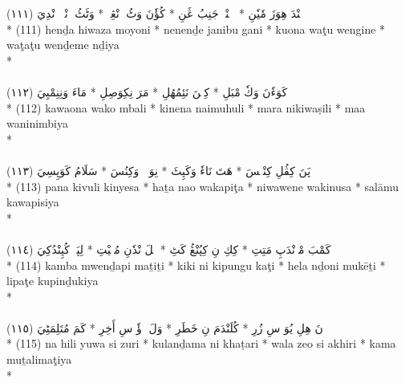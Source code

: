 \documentclass[a4paper, 12pt]{report}
\begin{document}
\begin{center}
\textarabic{(١١١) \textcolor{mygreen}{هٖنْدَ هِوَزَ مٗيٗنِ  * نٖنٖنْدٖ جَنِبُ ڠَنِ  * كُؤٗنَ وَٹُ وٖنْڠِنٖ  * وَٹَٹُ وٖنْدٖمٖ نْدِيَ }} \\* 
(111) henḏa hiwaza moyoni  * nenenḏe janibu gani  * kuona waţu wengine  * waţaţu wenḏeme nḏiya  \\* 
 \\ 
\\[8mm] 

\textarabic{(١١٢) \textcolor{mygreen}{كَوَءٗنَ وَكٗ مْبَلِ  * كِنٖنَ نَئِمُهُلِ  * مَرَ نِكِوَصِلِ  * مَاءَ وَنِنِمْبِيَ }} \\* 
(112) kawaona wako mbali  * kinena naimuhuli  * mara nikiwaṣili  * maa waninimbiya  \\* 
 \\ 
\\[8mm] 

\textarabic{(١١٣) \textcolor{mygreen}{پَنَ كِڤُلِ كِنْيٖسَ  * هَتَ نَاءٗ وَكَپِٹَ  * نِوَوٖنٖ وَكِنُسَ  * سَلَامُ كَوَپِسِيَ }} \\* 
(113) pana kivuli kinyesa  * haṯa nao wakapiţa  * niwawene wakinusa  * salāmu kawapisiya  \\* 
 \\ 
\\[8mm] 

\textarabic{(١١٤) \textcolor{mygreen}{كَمْبَ مْوٖنْدَپِ مَتِتِ  * كِكِ نِ كِپُنْڠُ كَٹِ  * هٖلَ نْدٗنِ مُكٖيْتِ  * لِپَٹٖ كُپِنْدُكِيَ }} \\* 
(114) kamba mwenḏapi maṯiṯi  * kiki ni kipungu kaţi  * hela nḏoni mukēṯi  * lipaţe kupinḏukiya  \\* 
 \\ 
\\[8mm] 

\textarabic{(١١٥) \textcolor{mygreen}{نَ هِلِ يُوَ سِ زُرِ  * كُلَنْدَمَ نِ خَطَرِ  * وَلَ زٖؤٗ سِ أَخِرِ  * كَمَ مُتَلِمَٹِيَ }} \\* 
(115) na hili yuwa si zuri  * kulanḏama ni khaṭari  * wala zeo si akhiri  * kama muṯalimaţiya  \\* 
 \\ 
\\[8mm] 


\end{center}
\end{document}
